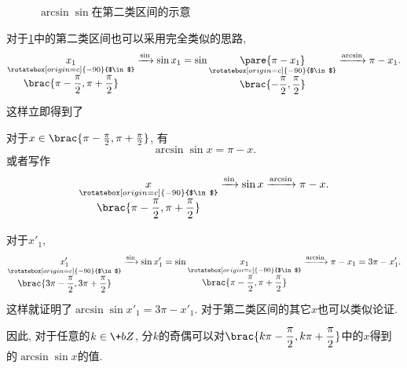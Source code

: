 \documentclass{ctexart}
\begin{document}
\begin{figure}[ht]
    \centering
    \caption{$\arcsin\sin$在第二类区间的示意}
    \label{fig:sin第二类示意}
\end{figure}
\par
对于\cref{fig:sin第二类示意}中的第二类区间也可以采用完全类似的思路,
\[ \underset{ \underset{\displaystyle \brac{\pi -\frac{\pi}{2},\pi + \frac{\pi}{2}}}{\mathbin{\rotatebox[origin=c]{-90}{$\in$}}}}{x_1} \xrightarrow{\sin} \sin x_1 = \sin \underset{ \underset{\displaystyle \brac{-\frac{\pi}{2},\frac{\pi}{2}}}{\mathbin{\rotatebox[origin=c]{-90}{$\in$}}}}{\pare{\pi - x_1}} \xrightarrow{\arcsin} \pi - x_1. \]
这样立即得到了
\begin{finale}
    \begin{lemma}
        \label{lem:arcsin关系2}
        对于$x\in \brac{\pi -\frac{\pi}{2},\pi + \frac{\pi}{2}}$, 有
        \[ \arcsin \sin x = \pi - x. \]
        或者写作
        \[ \underset{ \underset{\displaystyle \brac{\pi -\frac{\pi}{2},\pi + \frac{\pi}{2}}}{\mathbin{\rotatebox[origin=c]{-90}{$\in$}}}}{x} \xrightarrow{\sin} \sin x \xrightarrow{\arcsin} \pi - x. \]
    \end{lemma}
\end{finale}
对于$x'_1$,
\[ \underset{ \underset{\displaystyle \brac{3\pi -\frac{\pi}{2},3\pi + \frac{\pi}{2}}}{\mathbin{\rotatebox[origin=c]{-90}{$\in$}}}}{x'_1} \xrightarrow{\sin} \sin x'_1 = \sin \underset{ \underset{\displaystyle \brac{\pi-\frac{\pi}{2},\pi + \frac{\pi}{2}}}{\mathbin{\rotatebox[origin=c]{-90}{$\in$}}}}{x_1} \xrightarrow{\arcsin} \pi - x_1  = 3\pi - x'_1. \]
这样就证明了$\arcsin \sin x'_1 = 3\pi - x'_1$. 对于第二类区间的其它$x$也可以类似论证.
\par
因此, 对于任意的$k\in\+bZ$, 分$k$的奇偶可以对$\displaystyle \brac{k\pi - \frac{\pi}{2}, k\pi + \frac{\pi}{2}}$中的$x$得到的$\arcsin \sin x$的值.
\end{document}
